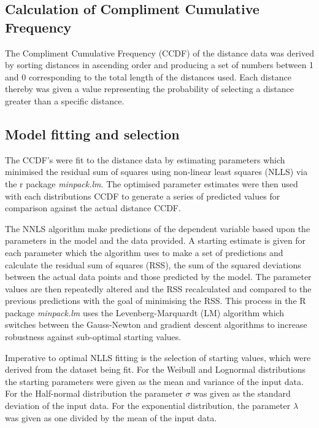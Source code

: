 \documentclass[11pt]{article}
\begin{document}
\begin{linenumbers}
\subsection{Calculation of Compliment Cumulative Frequency}
The Compliment Cumulative Frequency (CCDF) of the distance data was derived by sorting distances in ascending order and producing a set of numbers between 1 and 0 corresponding to the total length of the distances used. Each distance thereby was given a value representing the probability of selecting a distance greater than a specific distance.

\subsection{Model fitting and selection}
The CCDF's were fit to the distance data by estimating parameters which minimised the residual sum of squares using non-linear least squares (NLLS) via the r package \textit{minpack.lm}. The optimised parameter estimates were then used with each distributions CCDF to generate a series of predicted values for comparison against the actual distance CCDF.\par

The NNLS algorithm make predictions of the dependent variable based upon the parameters in the model and the data provided. A starting estimate is given for each parameter which the algorithm uses to make a set of predictions and calculate the residual sum of squares (RSS), the sum of the squared deviations between the actual data points and those predicted by the model. The parameter values are then repeatedly altered and the RSS recalculated and compared to the previous predictions with the goal of minimising the RSS. This process in the R package \textit{minpack.lm} uses the Levenberg-Marquardt (LM) algorithm which switches between the Gauss-Newton and gradient descent algorithms to increase robustness against sub-optimal starting values.\par

Imperative to optimal NLLS fitting is the selection of starting values, which were derived from the dataset being fit. For the Weibull and Lognormal distributions the starting parameters were given as the mean and variance of the input data. For the Half-normal distribution the parameter $\sigma$ was given as the standard deviation of the input data. For the exponential distribution, the parameter $\lambda$ was given as one divided by the mean of the input data.\par


\end{linenumbers}
\end{document}
